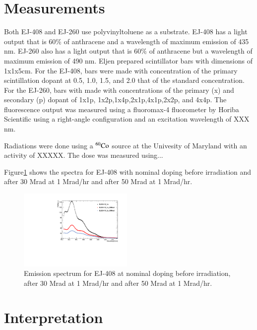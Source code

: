 \documentclass[review]{elsarticle}
\begin{document}
\section{Measurements}
Both EJ-408 and EJ-260 use polyvinyltoluene as a substrate.  EJ-408 has a light output that is 60\% of anthracene and a wavelength of maximum emission of 435 nm.  
EJ-260 also has a light output that is 60\% of anthracene but a wavelength of maximum emission of 490 nm.  Eljen prepared scintillator bars
with dimensions of 1x1x5cm.  For the EJ-408, bars were made with concentration of the primary scintillation dopant at 0.5, 1.0, 1.5, and 2.0 that of
the standard concentration.  For the EJ-260, bars with made with concentrations of the primary (x) and secondary (p) dopant of 1x1p, 1x2p,1x4p,2x1p,4x1p,2x2p, and 4x4p.
The fluorescence output was measured using a fluoromax-4 fluorometer by Horiba Scientific using a right-angle configuration and an excitation wavelength of
XXX nm.

Radiations were done using a ${\rm ^{60}Co}$ source at the Univesity of Maryland with an activity of XXXXX.
The dose was measured using...

Figure\ref{fig:ej408doping1x} shows the spectra for EJ-408 with nominal doping before irradiation and after
30 Mrad at 1 Mrad/hr and after 50 Mrad at 1 Mrad/hr.

\begin{figure}[!ht]
\begin{center}
\includegraphics[width=0.49\textwidth]{plot_EJ200-1X_EMS.pdf}
\caption{
Emission spectrum for EJ-408 at nominal doping before irradiation, after 30 Mrad at 1 Mrad/hr and after 50 Mrad at 1 Mrad/hr.
}
\label{fig:ej408doping1x}
\end{center}
\end{figure}


\section{Interpretation}
\end{document}
